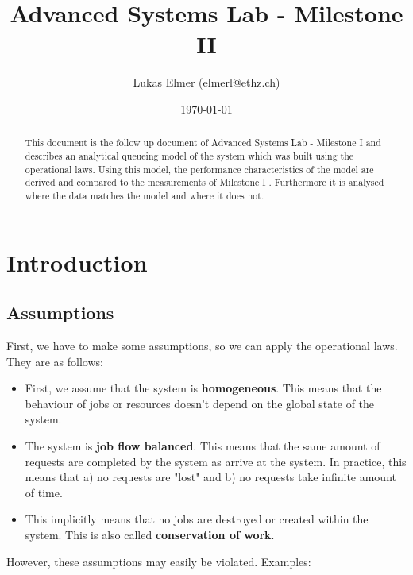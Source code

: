 \documentclass[a4paper]{article}
\title{Advanced Systems Lab - Milestone II}
\author{Lukas Elmer (elmerl@ethz.ch)}
\date{\today}
\begin{document}
\maketitle

\pagebreak

\tableofcontents

\pagebreak

\begin{abstract}

This document is the follow up document of Advanced Systems Lab - Milestone I \cite{milestone1} and describes an analytical queueing model of the system which was built using the operational laws. Using this model, the performance characteristics of the model are derived and compared to the measurements of Milestone I \cite{milestone1}. Furthermore it is analysed where the data matches the model and where it does not.

\end{abstract}

\pagebreak

\section{Introduction}

\subsection{Assumptions}

First, we have to make some assumptions, so we can apply the operational laws. They are as follows:

\begin{itemize}
\item First, we assume that the system is \textbf{homogeneous}. This means that the behaviour of jobs or resources doesn't depend on the global state of the system.
\item The system is \textbf{job flow balanced}. This means that the same amount of requests are completed by the system as arrive at the system. In practice, this means that a) no requests are "lost" and b) no requests take infinite amount of time.
\item This implicitly means that no jobs are destroyed or created within the system. This is also called \textbf{conservation of work}.
\end{itemize}

However, these assumptions may easily be violated. Examples:\\
\end{document}
